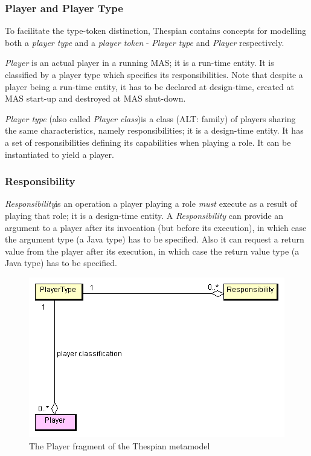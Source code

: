\subsubsection*{Player and Player Type}

To facilitate the type-token distinction, Thespian contains concepts for modelling both a \textit{player type} and a \textit{player token} - \textit{Player type} and \textit{Player} respectively.

\textit{Player} is an actual player in a running MAS; it is a run-time entity.
It is classified by a player type which specifies its responsibilities.
Note that despite a player being a run-time entity, it has to be declared at design-time, created at MAS start-up and destroyed at MAS shut-down.

\textit{Player type} (also called \textit{Player class})is a class (ALT: family) of players sharing the same characteristics, namely responsibilities; it is a design-time entity.
It has a set of responsibilities defining its capabilities when playing a role.
It can be instantiated to yield a player. 

\subsubsection*{Responsibility}

\textit{Responsibility}is an operation a player playing a role \textit{must} execute as a result of playing that role; it is a design-time entity. 
A \textit{Responsibility} can provide an argument to a player after its invocation (but before its execution), in which case the argument type (a Java type) has to be specified.
Also it can request a return value from the player after its execution, in which case the return value type (a Java type) has to be specified.

\begin{figure}[ht]
	\centering
	\includegraphics[width=\textwidth]{images/thespian/player-metamodel.png}
	\caption{The Player fragment of the Thespian metamodel}
	\label{figure:thespian-player-metamodel}
\end{figure}

